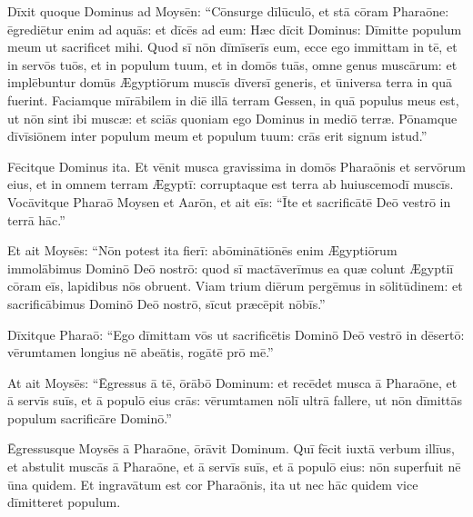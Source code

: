 Dīxit quoque
Dominus ad Moysēn: ``Cōnsurge
dīlūculō, et stā cōram Pharaōne:
ēgrediētur enim ad aquās: et dīcēs ad eum: Hæc dīcit Dominus: Dīmitte
populum meum ut sacrificet mihi.  Quod sī nōn dīmīserīs eum, ecce ego
immittam in tē, et in servōs tuōs,
et in populum tuum, et in domōs tuās, omne genus muscārum:
et implēbuntur domūs Ægyptiōrum muscīs
dīversī generis, et ūniversa terra in quā fuerint. 
Faciamque mīrābilem in diē illā terram Gessen, in quā populus meus est, ut
nōn sint ibi muscæ: et sciās quoniam ego Dominus in mediō
terræ.  Pōnamque dīvīsiōnem inter populum meum et populum
tuum: crās erit signum istud.''

Fēcitque Dominus ita. Et vēnit
musca gravissima in domōs Pharaōnis et
servōrum eius, et in omnem terram Ægyptī: corruptaque est
terra ab huiuscemodī muscīs.  Vocāvitque
Pharaō Moysen et Aarōn, et ait eīs: ``Īte et
sacrificātē Deō vestrō in terrā hāc.''  

Et ait Moysēs:
``Nōn potest ita fierī: abōminātiōnēs enim Ægyptiōrum
immolābimus Dominō Deō nostrō: quod sī
mactāverīmus ea quæ colunt Ægyptiī cōram eīs,
lapidibus nōs obruent.  Viam trium diērum
pergēmus in sōlitūdinem: et sacrificābimus Dominō Deō nostrō, sīcut
præcēpit nōbīs.''

Dīxitque
Pharaō: ``Ego dīmittam vōs ut 
sacrificētis Dominō Deō vestrō
in dēsertō: vērumtamen longius nē abeātis, rogātē prō mē.''

At ait Moysēs: ``Ēgressus ā tē, ōrābō Dominum: et
recēdet musca ā Pharaōne, et ā servīs suīs,
et ā populō eius crās: vērumtamen nōlī ultrā fallere, ut
nōn dīmittās populum 
sacrificāre Dominō.''

Ēgressusque Moysēs ā
Pharaōne, ōrāvit Dominum.  Quī fēcit iuxtā verbum illīus,
et abstulit muscās ā Pharaōne, et ā servīs
suīs, et ā populō eius: nōn superfuit nē ūna quidem.  Et
ingravātum est cor
Pharaōnis, ita ut nec hāc quidem vice dīmitteret populum.
